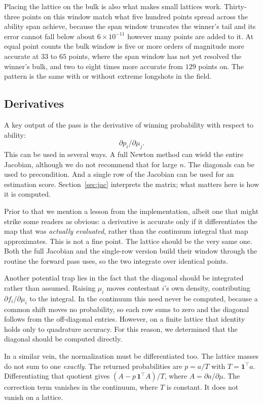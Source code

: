 \documentclass[11pt]{article}
\begin{document}
Placing the lattice on the bulk is also what makes small lattices work.
Thirty-three points on this window match what five hundred points spread
across the ability span achieve, because the span window truncates the
winner's tail and its error cannot fall below about $6\times10^{-11}$
however many points are added to it. At equal point counts the bulk window
is five or more orders of magnitude more accurate at $33$ to $65$ points,
where the span window has not yet resolved the winner's bulk, and two to
eight times more accurate from $129$ points on. The pattern is the same
with or without extreme longshots in the field.



\subsection{Derivatives}

A key output of the pass is the derivative of winning probability with respect to ability:
$$
\partial p_i/\partial\mu_j.
$$
This can be used in several ways. A full Newton method can wield the entire Jacobian, although we do not recommend that for large $n$. The diagonals can be used to precondition. And a single row of the Jacobian can be used for an estimation score. Section~\ref{sec:jac} interprets the matrix; what
matters here is how it is computed.

Prior to that we mention a lesson from the implementation, albeit one
that might strike some readers as obvious: a derivative is accurate only
if it differentiates the map that was \emph{actually evaluated}, rather
than the continuum integral that map approximates. This is not a fine point. The lattice should be the very same one. Both the full Jacobian and the single-row version build their window through the routine the forward
pass uses, so the two integrate over identical points.

Another potential trap lies in the fact that the diagonal should be integrated rather than assumed. Raising $\mu_i$
moves contestant $i$'s own density, contributing $\partial
f_i/\partial\mu_i$ to the integral. In the continuum this need never be
computed, because a common shift moves no probability, so each row sums to zero
and the diagonal follows from the off-diagonal entries. However, on a finite
lattice that identity holds only to quadrature accuracy. For this
reason, we determined that the diagonal should be computed directly.

In a similar vein, the normalization must be differentiated too. The lattice masses do
not sum to one \emph{exactly}. The returned probabilities are $p=a/T$ with
$T=\mathbf{1}^{\top}a$. Differentiating that quotient gives
$(A-p\,\mathbf{1}^{\top}A)/T$, where $A=\partial a/\partial\mu$. The
correction term vanishes in the continuum, where $T$ is constant. It does not vanish on a lattice.
\end{document}
